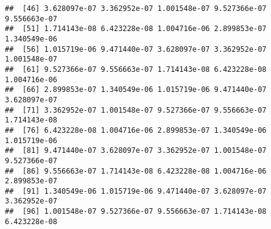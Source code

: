 \documentclass{article}
\makeatletter
\newenvironment{kframe}{%
 \def\at@end@of@kframe{}%
 \ifinner\ifhmode%
  \def\at@end@of@kframe{\end{minipage}}%
  \begin{minipage}{\columnwidth}%
 \fi\fi%
 \def\FrameCommand##1{\hskip\@totalleftmargin \hskip-\fboxsep
 \colorbox{shadecolor}{##1}\hskip-\fboxsep
     \hskip-\linewidth \hskip-\@totalleftmargin \hskip\columnwidth}%
 \MakeFramed {\advance\hsize-\width
   \@totalleftmargin\z@ \linewidth\hsize
   \@setminipage}}%
 {\par\unskip\endMakeFramed%
 \at@end@of@kframe}
\newenvironment{knitrout}{}{} %
\makeatother
\begin{document}
\begin{knitrout}
\begin{kframe}
\begin{verbatim}
##  [46] 3.628097e-07 3.362952e-07 1.001548e-07 9.527366e-07 9.556663e-07
##  [51] 1.714143e-08 6.423228e-08 1.004716e-06 2.899853e-07 1.340549e-06
##  [56] 1.015719e-06 9.471440e-07 3.628097e-07 3.362952e-07 1.001548e-07
##  [61] 9.527366e-07 9.556663e-07 1.714143e-08 6.423228e-08 1.004716e-06
##  [66] 2.899853e-07 1.340549e-06 1.015719e-06 9.471440e-07 3.628097e-07
##  [71] 3.362952e-07 1.001548e-07 9.527366e-07 9.556663e-07 1.714143e-08
##  [76] 6.423228e-08 1.004716e-06 2.899853e-07 1.340549e-06 1.015719e-06
##  [81] 9.471440e-07 3.628097e-07 3.362952e-07 1.001548e-07 9.527366e-07
##  [86] 9.556663e-07 1.714143e-08 6.423228e-08 1.004716e-06 2.899853e-07
##  [91] 1.340549e-06 1.015719e-06 9.471440e-07 3.628097e-07 3.362952e-07
##  [96] 1.001548e-07 9.527366e-07 9.556663e-07 1.714143e-08 6.423228e-08
\end{verbatim}
\end{kframe}
\end{knitrout}
\end{document}
